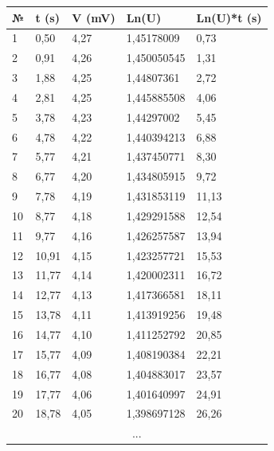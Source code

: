 \documentclass[a4paper, 10pt, twocolumn]{article}
\begin{document}
{\small
\begin{table}[]
    \begin{tabular}{|l|l|l|l|l|} \hline
    №             & t (s)  & V (mV) & Ln(U)       & Ln(U)*t (s) \\ \hline
    1             & 0,50   & 4,27   & 1,45178009  & 0,73        \\ \hline
    2             & 0,91   & 4,26   & 1,450050545 & 1,31        \\ \hline
    3             & 1,88   & 4,25   & 1,44807361  & 2,72        \\ \hline
    4             & 2,81   & 4,25   & 1,445885508 & 4,06        \\ \hline
    5             & 3,78   & 4,23   & 1,44297002  & 5,45        \\ \hline
    6             & 4,78   & 4,22   & 1,440394213 & 6,88        \\ \hline
    7             & 5,77   & 4,21   & 1,437450771 & 8,30        \\ \hline
    8             & 6,77   & 4,20   & 1,434805915 & 9,72        \\ \hline
    9             & 7,78   & 4,19   & 1,431853119 & 11,13       \\ \hline
    10            & 8,77   & 4,18   & 1,429291588 & 12,54       \\ \hline
    11            & 9,77   & 4,16   & 1,426257587 & 13,94       \\ \hline
    12            & 10,91  & 4,15   & 1,423257721 & 15,53       \\ \hline
    13            & 11,77  & 4,14   & 1,420002311 & 16,72       \\ \hline
    14            & 12,77  & 4,13   & 1,417366581 & 18,11       \\ \hline
    15            & 13,78  & 4,11   & 1,413919256 & 19,48       \\ \hline
    16            & 14,77  & 4,10   & 1,411252792 & 20,85       \\ \hline
    17            & 15,77  & 4,09   & 1,408190384 & 22,21       \\ \hline
    18            & 16,77  & 4,08   & 1,404883017 & 23,57       \\ \hline
    19            & 17,77  & 4,06   & 1,401640997 & 24,91       \\ \hline
    20            & 18,78  & 4,05   & 1,398697128 & 26,26       \\ \hline
    \multicolumn{5}{c}{...} \\ \hline

\end{tabular}
\end{table}}
\end{document}
